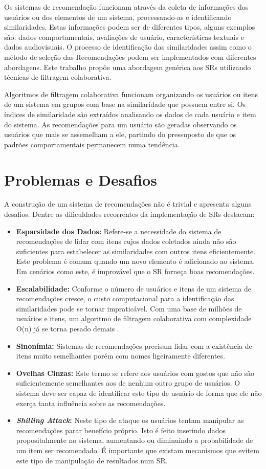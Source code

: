 \documentclass[
	12pt,				%
    oneside,			%
	a4paper,			%
	english,			%
	french,				%
	spanish,			%
	brazil,				%
	]{abntex2}
\begin{document}
Os sistemas de recomendação funcionam através da coleta de informações dos usuários ou dos elementos de um sistema, processando-as e 
identificando similaridades. Estas informações podem ser de diferentes tipos, alguns exemplos são: dados comportamentais, avaliações de usuário,
características textuais e dados audiovisuais. O processo de identificação das similaridades assim como o método de seleção das Recomendações podem 
ser implementados com diferentes abordagens. Este trabalho propõe uma abordagem genérica aos SRs utilizando técnicas de filtragem colaborativa.

Algoritmos de filtragem colaborativa funcionam organizando os usuários ou itens de um sistema em grupos com base na similaridade que possuem entre si.
Os índices de similaridade são extraídos analisando os dados de cada usuário e item do sistema. As recomendações para um usuário são geradas observando
os usuários que mais se assemelham a ele, partindo do pressuposto de que os padrões comportamentais permanecem numa tendência. 
\section{Problemas e Desafios}
A construção de um sistema de recomendações não é trivial e apresenta alguns desafios. Dentre as dificuldades recorrentes da 
implementação de SRs  destacam:

\begin{itemize}
	\item \textbf{Esparsidade dos Dados:} Refere-se a necessidade do sistema de recomendações de lidar com itens cujos dados coletados ainda não são
	suficientes para estabelecer as similaridades com outros itens eficientemente. Este problema é comum quando um novo elemento é adicionado ao sistema. Em cenários
	como este, é improvável que o SR forneça boas recomendações.
	\item \textbf{Escalabilidade:} Conforme o número de usuários e itens de um sistema de recomendações cresce, o custo computacional para a identificação
	das similaridades pode se tornar impraticável. Com uma base de milhões de usuários e itens, um algoritmo de filtragem colaborativa com complexidade O(n)
	já se torna pesado demais \cite{2-CFSurvey}. 
	\item \textbf{Sinonímia:} Sistemas de recomendações precisam lidar com a existência de itens muito semelhantes porém com nomes ligeiramente diferentes.
	\item \textbf{Ovelhas Cinzas:} Este termo se refere aos usuários com gostos que não são suficientemente semelhantes aos de nenhum outro grupo de usuários. O sistema deve
	ser capaz de identificar este tipo de usuário de forma que ele não exerça tanta influência sobre as recomendações.
	\item \textbf{\textit{Shilling Attack}:} Neste tipo de ataque os usuários tentam manipular as recomendações parar benefício
	próprio. Isto é feito inserindo dados propositalmente no sistema, aumentando ou diminuindo a probabilidade de um item ser recomendado. É importante que existam
	mecanismos que evitem este tipo de manipulação de resultados num SR.
\end{itemize}
\end{document}
